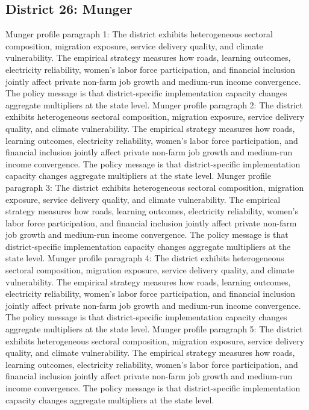 \documentclass[preprint,12pt]{elsarticle}
\begin{document}
\subsection{District 26: Munger}
Munger profile paragraph 1: The district exhibits heterogeneous sectoral composition, migration exposure, service delivery quality, and climate vulnerability. The empirical strategy measures how roads, learning outcomes, electricity reliability, women's labor force participation, and financial inclusion jointly affect private non-farm job growth and medium-run income convergence. The policy message is that district-specific implementation capacity changes aggregate multipliers at the state level.
Munger profile paragraph 2: The district exhibits heterogeneous sectoral composition, migration exposure, service delivery quality, and climate vulnerability. The empirical strategy measures how roads, learning outcomes, electricity reliability, women's labor force participation, and financial inclusion jointly affect private non-farm job growth and medium-run income convergence. The policy message is that district-specific implementation capacity changes aggregate multipliers at the state level.
Munger profile paragraph 3: The district exhibits heterogeneous sectoral composition, migration exposure, service delivery quality, and climate vulnerability. The empirical strategy measures how roads, learning outcomes, electricity reliability, women's labor force participation, and financial inclusion jointly affect private non-farm job growth and medium-run income convergence. The policy message is that district-specific implementation capacity changes aggregate multipliers at the state level.
Munger profile paragraph 4: The district exhibits heterogeneous sectoral composition, migration exposure, service delivery quality, and climate vulnerability. The empirical strategy measures how roads, learning outcomes, electricity reliability, women's labor force participation, and financial inclusion jointly affect private non-farm job growth and medium-run income convergence. The policy message is that district-specific implementation capacity changes aggregate multipliers at the state level.
Munger profile paragraph 5: The district exhibits heterogeneous sectoral composition, migration exposure, service delivery quality, and climate vulnerability. The empirical strategy measures how roads, learning outcomes, electricity reliability, women's labor force participation, and financial inclusion jointly affect private non-farm job growth and medium-run income convergence. The policy message is that district-specific implementation capacity changes aggregate multipliers at the state level.
\end{document}
